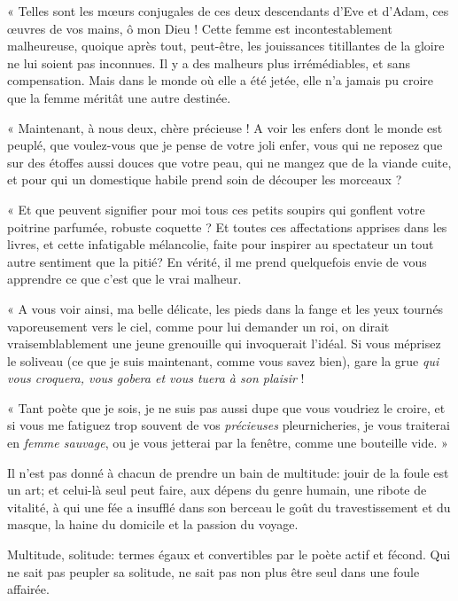 « Telles sont les m\oe urs conjugales de ces deux descendants
d’Eve et d’Adam, ces \oe uvres de vos
mains, ô mon Dieu ! Cette femme est incontestablement malheureuse,
quoique après tout, peut{}-être, les jouissances titillantes de la
gloire ne lui soient pas inconnues. Il y a des malheurs plus
irrémédiables, et sans compensation. Mais dans le monde où elle a été
jetée, elle n’a jamais pu croire que la femme méritât
une autre destinée.

« Maintenant, à nous deux, chère précieuse ! A voir les enfers dont le 
monde est peuplé, que voulez{}-vous que je pense de votre joli enfer,
vous qui ne reposez que sur des étoffes aussi douces que votre peau,
qui ne mangez que de la viande cuite, et pour qui un domestique habile
prend soin de découper les morceaux ?

« Et que peuvent signifier pour moi tous ces petits soupirs qui gonflent
votre poitrine parfumée, robuste coquette ? Et toutes ces affectations
apprises dans les livres, et cette infatigable mélancolie, faite pour inspirer au spectateur un tout autre
sentiment que la pitié? En vérité, il me prend quelquefois envie de
vous apprendre ce que c’est que le vrai malheur.

« A vous voir ainsi, ma belle délicate, les pieds dans la fange et les
yeux tournés vaporeusement vers le ciel, comme pour lui demander un
roi, on dirait vraisemblablement une jeune grenouille qui invoquerait
l’idéal. Si vous méprisez le soliveau (ce que je suis
maintenant, comme vous savez bien), gare la grue \textit{qui vous croquera,
vous gobera et vous tuera à son plaisir} !

« Tant poète que je sois, je ne suis pas aussi dupe que vous voudriez le
croire, et si vous me fatiguez trop souvent de vos \textit{précieuses}
pleurnicheries, je vous traiterai en \textit{femme sauvage}, ou je vous jetterai
par la fenêtre, comme une bouteille vide. »


Il n’est pas donné à chacun de prendre un bain de
multitude: jouir de la foule est un art; et celui{}-là seul peut faire,
aux dépens du genre humain, une ribote de vitalité, à qui une fée a
insufflé dans son berceau le goût du travestissement et du masque, la
haine du domicile et la passion du voyage.

Multitude, solitude: termes égaux et convertibles par le poète actif et
fécond. Qui ne sait pas peupler sa solitude, ne sait pas non plus être
seul dans une foule affairée.

